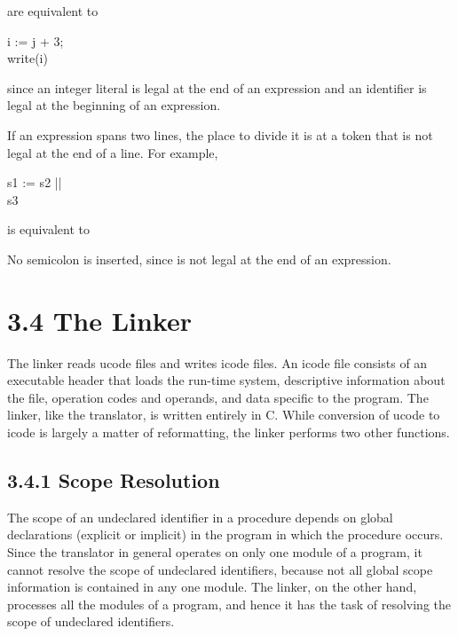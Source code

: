 \noindent are equivalent to

\begin{iconcode}
\>i := j + 3;\\
\>write(i)
\end{iconcode}

\noindent since an integer literal is legal at the end of an
expression and an identifier is legal at the beginning of an
expression.

If an expression spans two lines, the place to divide it is at a token
that is not legal at the end of a line. For example,

\begin{iconcode}
\>s1 := s2 ||\\
\>\>s3
\end{iconcode}

\noindent is equivalent to


\noindent No semicolon is inserted, since
\texttt{{\textbar}{\textbar}} is not legal at the end of an
expression.

\section[3.4 The Linker]{3.4 The Linker}

The linker reads ucode files and writes icode files. An icode file
consists of an executable header that loads the run-time system,
descriptive information about the file, operation codes and operands,
and data specific to the program. The linker, like the translator, is
written entirely in C. While conversion of ucode to icode is largely a
matter of reformatting, the linker performs two other functions.

\subsection[3.4.1 Scope Resolution]{3.4.1 Scope Resolution}

The scope of an undeclared identifier in a procedure depends on global
declarations (explicit or implicit) in the program in which the
procedure occurs. Since the translator in general operates on only one
module of a program, it cannot resolve the scope of undeclared
identifiers, because not all global scope information is contained in
any one module. The linker, on the other hand, processes all the
modules of a program, and hence it has the task of resolving the scope
of undeclared identifiers.


